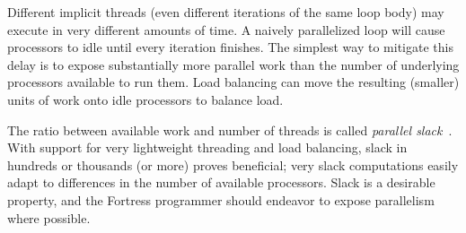 %
%
%
%


Different implicit threads (even different iterations of the same loop
body) may execute in very different amounts of time.  A naively
parallelized loop will cause processors to idle until every iteration
finishes.  The simplest way to mitigate this delay is to expose
substantially more parallel work than the number of underlying
processors available to run them.  Load balancing can move the
resulting (smaller) units of work onto idle processors to balance
load.

The ratio between available work and number of threads is called
\emph{parallel slack}~\cite{blumofe,CilkSched}.
With support for very lightweight
threading and load balancing, 
slack in hundreds or thousands (or more) proves beneficial; 
very slack computations easily adapt to differences in the
number of available processors.  Slack is a desirable property, and
the Fortress programmer should endeavor to expose parallelism where
possible.
